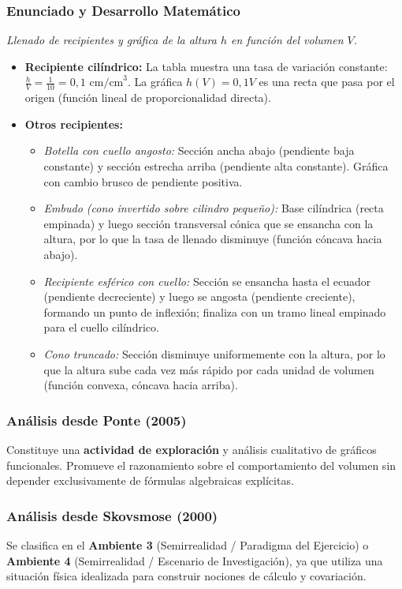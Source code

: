 \documentclass[11pt,a4paper]{article}
\begin{document}
\subsubsection{Enunciado y Desarrollo Matemático}
\textit{Llenado de recipientes y gráfica de la altura $h$ en función del volumen $V$.}
\begin{itemize}
    \item[a)] \textbf{Recipiente cilíndrico:} La tabla muestra una tasa de variación constante: $\frac{h}{V} = \frac{1}{10} = 0{,}1\text{ cm/cm}^3$. La gráfica $h(V) = 0{,}1 V$ es una recta que pasa por el origen (función lineal de proporcionalidad directa).
    \item[b)] \textbf{Otros recipientes:}
    \begin{itemize}
        \item \textit{Botella con cuello angosto:} Sección ancha abajo (pendiente baja constante) y sección estrecha arriba (pendiente alta constante). Gráfica con cambio brusco de pendiente positiva.
        \item \textit{Embudo (cono invertido sobre cilindro pequeño):} Base cilíndrica (recta empinada) y luego sección transversal cónica que se ensancha con la altura, por lo que la tasa de llenado disminuye (función cóncava hacia abajo).
        \item \textit{Recipiente esférico con cuello:} Sección se ensancha hasta el ecuador (pendiente decreciente) y luego se angosta (pendiente creciente), formando un punto de inflexión; finaliza con un tramo lineal empinado para el cuello cilíndrico.
        \item \textit{Cono truncado:} Sección disminuye uniformemente con la altura, por lo que la altura sube cada vez más rápido por cada unidad de volumen (función convexa, cóncava hacia arriba).
    \end{itemize}
\end{itemize}

\subsubsection{Análisis desde Ponte (2005)}
Constituye una \textbf{actividad de exploración} y análisis cualitativo de gráficos funcionales. Promueve el razonamiento sobre el comportamiento del volumen sin depender exclusivamente de fórmulas algebraicas explícitas.

\subsubsection{Análisis desde Skovsmose (2000)}
Se clasifica en el \textbf{Ambiente 3} (Semirrealidad / Paradigma del Ejercicio) o \textbf{Ambiente 4} (Semirrealidad / Escenario de Investigación), ya que utiliza una situación física idealizada para construir nociones de cálculo y covariación.
\end{document}
